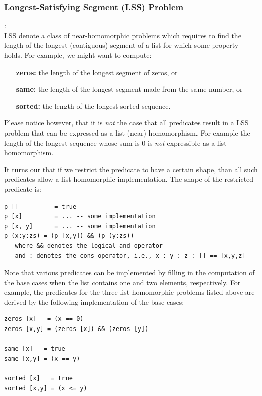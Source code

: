 \documentclass[acmsmall,review]{acmart}\settopmatter{printfolios=true,printccs=false,printacmref=false}
\begin{document}
\subsubsection{Longest-Satisfying Segment (LSS) Problem}:
$\mbox{ }$\\

LSS denote a class of near-homomorphic problems which requires 
to find the length of the longest (contiguous) segment of a list 
for which some property holds.
For example, we might want to compute:
\begin{itemize}
    \item[{\bf zeros:}] the length of the longest segment of 
            zeros, or 
    \item[{\bf same:}]  the length of the longest segment made 
            from the same number, or 
    \item[{\bf sorted:}] the length of the longest sorted 
            sequence.
\end{itemize}

Please notice however, that it is \emph{not} the case that all 
predicates result in a LSS problem that can be expressed as a
list (near) homomorphism. For example the length of the longest 
sequence whose sum is $0$ is \emph{not} expressible as a list 
homomorphism.

It turns our that if we restrict the predicate to have a certain
shape, than all such predicates allow a list-homomorphic implementation.
The shape of the restricted predicate is:

\begin{lstlisting}[mathescape=true]
p []          = true
p [x]         = ... -- some implementation
p [x, y]      = ... -- some implementation
p (x:y:zs) = (p [x,y]) && (p (y:zs))
-- where && denotes the logical-and operator
-- and : denotes the cons operator, i.e., x : y : z : [] == [x,y,z] 
\end{lstlisting}\vspace{-2ex}

Note that various predicates can be implemented by filling in the 
computation of the base cases when the list contains one and two
elements, respectively.   For example, the predicates for the
three list-homomorphic problems listed above are derived by the
following implementation of the base cases:

\begin{lstlisting}[mathescape=true]
zeros [x]   = (x == 0)           
zeros [x,y] = (zeros [x]) && (zeros [y])

same [x]   = true         
same [x,y] = (x == y)

sorted [x]   = true
sorted [x,y] = (x <= y)
\end{lstlisting}\vspace{-2ex}
\end{document}

